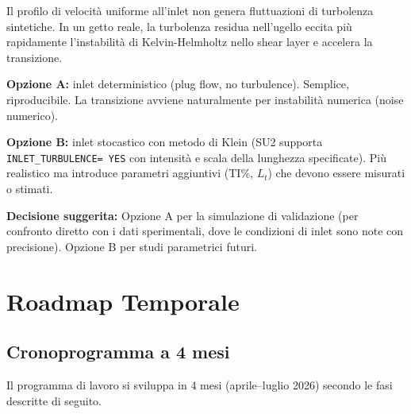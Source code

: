 \documentclass[11pt,a4paper]{article}
\newcommand{\ttcfg}[1]{\texttt{\color{codegray}#1}}
\begin{document}
Il profilo di velocità uniforme all'inlet non genera fluttuazioni di turbolenza sintetiche. In un getto reale, la turbolenza residua nell'ugello eccita più rapidamente l'instabilità di Kelvin-Helmholtz nello shear layer e accelera la transizione.

\textbf{Opzione A:} inlet deterministico (plug flow, no turbulence). Semplice, riproducibile. La transizione avviene naturalmente per instabilità numerica (noise numerico).

\textbf{Opzione B:} inlet stocastico con metodo di Klein (SU2 supporta \ttcfg{INLET\_TURBULENCE= YES} con intensità e scala della lunghezza specificate). Più realistico ma introduce parametri aggiuntivi (TI\%, $L_t$) che devono essere misurati o stimati.

\textbf{Decisione suggerita:} Opzione A per la simulazione di validazione (per confronto diretto con i dati sperimentali, dove le condizioni di inlet sono note con precisione). Opzione B per studi parametrici futuri.

\section{Roadmap Temporale}
\label{sec:roadmap}

\subsection{Cronoprogramma a 4 mesi}

Il programma di lavoro si sviluppa in 4 mesi (aprile--luglio 2026) secondo le fasi descritte di seguito.
\end{document}
